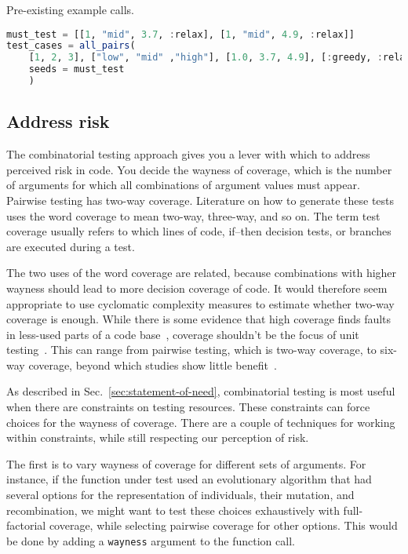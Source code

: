 \documentclass{juliacon}
\begin{document}
\vskip 6pt
Pre-existing example calls.
\begin{lstlisting}[language=Julia]
must_test = [[1, "mid", 3.7, :relax], [1, "mid", 4.9, :relax]]
test_cases = all_pairs(
    [1, 2, 3], ["low", "mid" ,"high"], [1.0, 3.7, 4.9], [:greedy, :relax, :optim];
    seeds = must_test
    )
\end{lstlisting}

\subsection{Address risk}

The combinatorial testing approach gives you a lever with which to address perceived risk in code. You decide the wayness of coverage, which is the number of arguments for which all combinations of argument values must appear. Pairwise testing has two-way coverage. Literature on how to generate these tests uses the word coverage to mean two-way, three-way, and so on. The term test coverage usually refers to which lines of code, if--then decision tests, or branches are executed during a test.

\vskip 6pt
The two uses of the word coverage are related, because combinations with higher wayness should lead to more decision coverage of code. It would therefore seem appropriate to use cyclomatic complexity measures to estimate whether two-way coverage is enough. While there is some evidence that high coverage finds faults in less-used parts of a code base~\cite{Cai2005-ex}, coverage shouldn't be the focus of unit testing~\cite{Inozemtseva2014-gz}. This can range from pairwise testing, which is two-way coverage, to six-way coverage, beyond which studies show little benefit~\cite{Petke2015-ex}.

\vskip 6pt
As described in Sec.~\ref{sec:statement-of-need}, combinatorial testing is most useful when there are constraints on testing resources. These constraints can force choices for the wayness of coverage. There are a couple of techniques for working within constraints, while still respecting our perception of risk.

\vskip 6pt
The first is to vary wayness of coverage for different sets of arguments. For instance, if the function under test used an evolutionary algorithm that had several options for the representation of individuals, their mutation, and recombination, we might want to test these choices exhaustively with full-factorial coverage, while selecting pairwise coverage for other options. This would be done by adding a \verb|wayness| argument to the function call.
\end{document}
